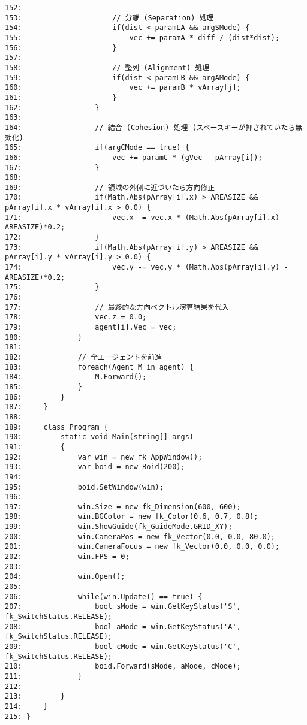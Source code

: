 \begin{breakbox}
\begin{small}
\begin{verbatim}
152: 
153:                     // 分離 (Separation) 処理
154:                     if(dist < paramLA && argSMode) {
155:                         vec += paramA * diff / (dist*dist);
156:                     }
157: 
158:                     // 整列 (Alignment) 処理
159:                     if(dist < paramLB && argAMode) {
160:                         vec += paramB * vArray[j];
161:                     }
162:                 }
163: 
164:                 // 結合 (Cohesion) 処理 (スペースキーが押されていたら無効化)
165:                 if(argCMode == true) {
166:                     vec += paramC * (gVec - pArray[i]);
167:                 }
168: 
169:                 // 領域の外側に近づいたら方向修正
170:                 if(Math.Abs(pArray[i].x) > AREASIZE && pArray[i].x * vArray[i].x > 0.0) {
171:                     vec.x -= vec.x * (Math.Abs(pArray[i].x) - AREASIZE)*0.2;
172:                 }
173:                 if(Math.Abs(pArray[i].y) > AREASIZE && pArray[i].y * vArray[i].y > 0.0) {
174:                     vec.y -= vec.y * (Math.Abs(pArray[i].y) - AREASIZE)*0.2;
175:                 }
176: 
177:                 // 最終的な方向ベクトル演算結果を代入
178:                 vec.z = 0.0;
179:                 agent[i].Vec = vec;
180:             }
181: 
182:             // 全エージェントを前進
183:             foreach(Agent M in agent) {
184:                 M.Forward();
185:             }
186:         }
187:     }
188: 
189:     class Program {
190:         static void Main(string[] args)
191:         {
192:             var win = new fk_AppWindow();
193:             var boid = new Boid(200);
194: 
195:             boid.SetWindow(win);
196: 
197:             win.Size = new fk_Dimension(600, 600);
198:             win.BGColor = new fk_Color(0.6, 0.7, 0.8);
199:             win.ShowGuide(fk_GuideMode.GRID_XY);
200:             win.CameraPos = new fk_Vector(0.0, 0.0, 80.0);
201:             win.CameraFocus = new fk_Vector(0.0, 0.0, 0.0);
202:             win.FPS = 0;
203: 
204:             win.Open();
205: 
206:             while(win.Update() == true) {
207:                 bool sMode = win.GetKeyStatus('S', fk_SwitchStatus.RELEASE);
208:                 bool aMode = win.GetKeyStatus('A', fk_SwitchStatus.RELEASE);
209:                 bool cMode = win.GetKeyStatus('C', fk_SwitchStatus.RELEASE);
210:                 boid.Forward(sMode, aMode, cMode);
211:             }
212: 
213:         }
214:     }
215: }
\end{verbatim}
\end{small}
\end{breakbox}
